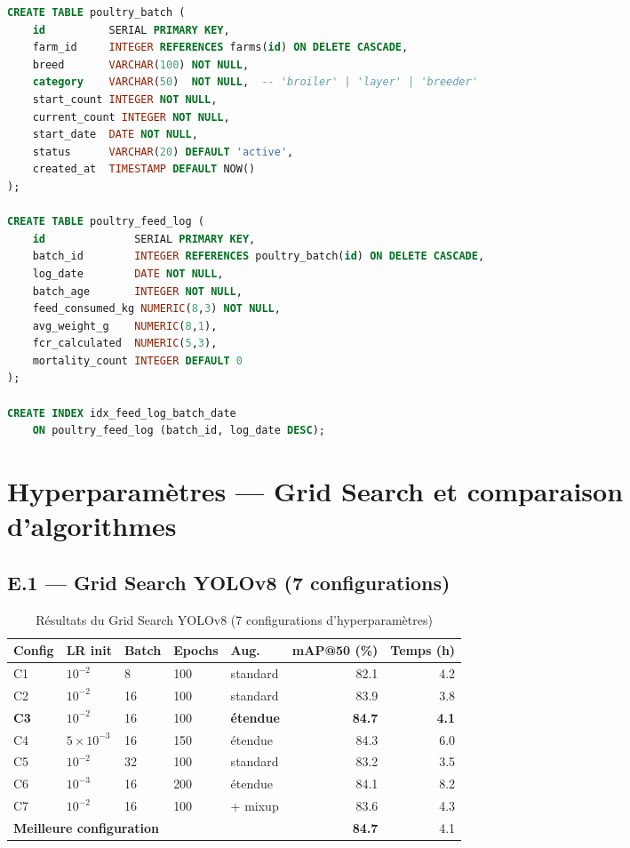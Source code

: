 \begin{lstlisting}[language=sql, caption={Schéma SQL simplifié — module aviculture}]
CREATE TABLE poultry_batch (
    id          SERIAL PRIMARY KEY,
    farm_id     INTEGER REFERENCES farms(id) ON DELETE CASCADE,
    breed       VARCHAR(100) NOT NULL,
    category    VARCHAR(50)  NOT NULL,  -- 'broiler' | 'layer' | 'breeder'
    start_count INTEGER NOT NULL,
    current_count INTEGER NOT NULL,
    start_date  DATE NOT NULL,
    status      VARCHAR(20) DEFAULT 'active',
    created_at  TIMESTAMP DEFAULT NOW()
);

CREATE TABLE poultry_feed_log (
    id              SERIAL PRIMARY KEY,
    batch_id        INTEGER REFERENCES poultry_batch(id) ON DELETE CASCADE,
    log_date        DATE NOT NULL,
    batch_age       INTEGER NOT NULL,
    feed_consumed_kg NUMERIC(8,3) NOT NULL,
    avg_weight_g    NUMERIC(8,1),
    fcr_calculated  NUMERIC(5,3),
    mortality_count INTEGER DEFAULT 0
);

CREATE INDEX idx_feed_log_batch_date
    ON poultry_feed_log (batch_id, log_date DESC);
\end{lstlisting}

\chapter{Hyperparamètres — Grid Search et comparaison d'algorithmes}
\label{ann:hyperparams}

\section*{E.1 — Grid Search YOLOv8 (7 configurations)}

\begin{table}[H]
\centering
\caption{Résultats du Grid Search YOLOv8 (7 configurations d'hyperparamètres)}
\label{tab:gs_yolo}
\begin{tabular}{lllllrr}
\toprule
\textbf{Config} & \textbf{LR init} & \textbf{Batch} & \textbf{Epochs} & \textbf{Aug.} & \textbf{mAP@50 (\%)} & \textbf{Temps (h)} \\
\midrule
C1 & $10^{-2}$ & 8  & 100 & standard   & 82.1 & 4.2 \\
C2 & $10^{-2}$ & 16 & 100 & standard   & 83.9 & 3.8 \\
\textbf{C3} & $10^{-2}$ & 16 & 100 & \textbf{étendue} & \textbf{84.7} & \textbf{4.1} \\
C4 & $5\times10^{-3}$ & 16 & 150 & étendue & 84.3 & 6.0 \\
C5 & $10^{-2}$ & 32 & 100 & standard   & 83.2 & 3.5 \\
C6 & $10^{-3}$ & 16 & 200 & étendue    & 84.1 & 8.2 \\
C7 & $10^{-2}$ & 16 & 100 & + mixup    & 83.6 & 4.3 \\
\midrule
\multicolumn{5}{l}{\textbf{Meilleure configuration}} & \textbf{84.7} & 4.1 \\
\bottomrule
\end{tabular}
\end{table}

